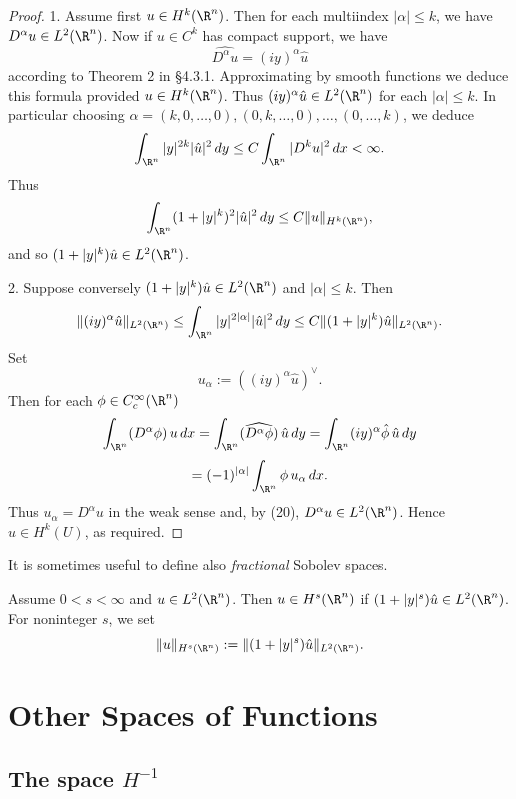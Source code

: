 \begin{proof}
1. Assume first $u \in H^k(\R^n)$. Then for each multiindex $|\alpha| \le k$, we have $D^\alpha u \in L^2(\R^n)$. Now if $u \in C^k$ has compact support, we have
$$\widehat{D^\alpha u} = (iy)^\alpha \hat{u}$$
according to Theorem 2 in §4.3.1. Approximating by smooth functions we deduce this formula provided $u \in H^k(\R^n)$. Thus $(iy)^\alpha \hat{u} \in L^2(\R^n)$ for each $|\alpha| \le k$. In particular choosing $\alpha = (k,0,\ldots,0), (0,k,\ldots,0), \ldots, (0,\ldots,k)$, we deduce
$$\int_{\R^n} |y|^{2k}|\hat{u}|^2\,dy \le C \int_{\R^n} |D^k u|^2\,dx < \infty.$$
Thus
$$\int_{\R^n} (1 + |y|^k)^2 |\hat{u}|^2\,dy \le C\|u\|_{H^k(\R^n)},$$
and so $(1 + |y|^k)\hat{u} \in L^2(\R^n)$.

2. Suppose conversely $(1 + |y|^k)\hat{u} \in L^2(\R^n)$ and $|\alpha| \le k$. Then
$$\|(iy)^\alpha \hat{u}\|_{L^2(\R^n)} \le \int_{\R^n} |y|^{2|\alpha|} |\hat{u}|^2\,dy \le C\|(1 + |y|^k)\hat{u}\|_{L^2(\R^n)}.$$
Set
$$u_\alpha := ((iy)^\alpha \hat{u})^\vee.$$
Then for each $\phi \in C_c^\infty(\R^n)$
$$\int_{\R^n} (D^\alpha \phi)\, u\,dx = \int_{\R^n} (\widehat{D^\alpha \phi})\,\hat{u}\,dy = \int_{\R^n} (iy)^\alpha \hat{\phi}\, \hat{u}\,dy$$
$$= (-1)^{|\alpha|} \int_{\R^n} \phi\, u_\alpha\,dx.$$
Thus $u_\alpha = D^\alpha u$ in the weak sense and, by (20), $D^\alpha u \in L^2(\R^n)$. Hence $u \in H^k(U)$, as required.
\end{proof}

It is sometimes useful to define also \textit{fractional} Sobolev spaces.

\begin{definition}
\label{def:fractional-sobolev-space}
Assume $0 < s < \infty$ and $u \in L^2(\R^n)$. Then $u \in H^s(\R^n)$ if $(1 + |y|^s)\hat u \in L^2(\R^n)$. For noninteger $s$, we set
$$\|u\|_{H^s(\R^n)} := \|(1 + |y|^s)\hat u\|_{L^2(\R^n)}.$$
\end{definition}

\section{Other Spaces of Functions}
\label{sec:other-spaces-of-functions}

\subsection{The space $H^{-1}$}

